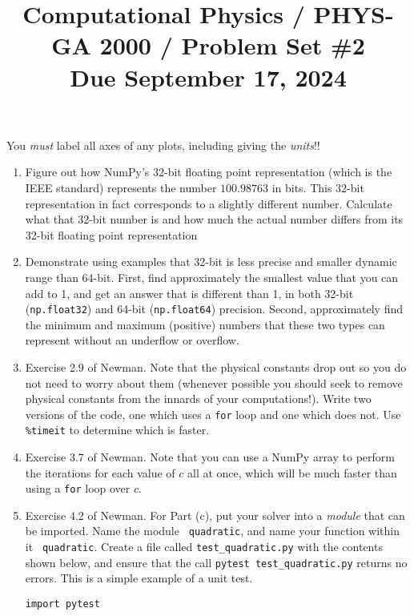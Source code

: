 \documentclass[11pt, preprint]{aastex}
\begin{document}
\title{\bf Computational Physics / PHYS-GA 2000 / Problem Set \#2
\\ Due September 17, 2024 }

You {\it must} label all axes of any plots, including giving the {\it
  units}!!

\begin{enumerate}

  \item Figure out how NumPy's 32-bit floating point representation
    (which is the IEEE standard) represents the number $100.98763$ in
    bits. This 32-bit representation in fact corresponds to a slightly
    different number. Calculate what that 32-bit number is and how
    much the actual number differs from its 32-bit floating point
    representation

  \item Demonstrate using examples that 32-bit is less precise and
    smaller dynamic range than 64-bit. First, find approximately the
    smallest value that you can add to 1, and get an answer that is
    different than 1, in both 32-bit ({\tt np.float32}) and 64-bit
    ({\tt np.float64}) precision. Second, approximately find the
    minimum and maximum (positive) numbers that these two types can
    represent without an underflow or overflow.

  \item Exercise 2.9 of Newman. Note that the physical constants drop
    out so you do not need to worry about them (whenever possible you
    should seek to remove physical constants from the innards of your
    computations!).  Write two versions of the code, one which uses a
    {\tt for} loop and one which does not.  Use {\tt \%timeit} to
    determine which is faster.

  \item Exercise 3.7 of Newman.  Note that you can use a NumPy array
    to perform the iterations for each value of $c$ all at once, which
    will be much faster than using a {\tt for} loop over $c$.

  \item Exercise 4.2 of Newman. For Part (c), put your solver into a
    {\it module} that can be imported. Name the module {\tt
      quadratic}, and name your function within it {\tt
      quadratic}. Create a file called {\tt test\_quadratic.py} with
    the contents shown below, and ensure that the call {\tt pytest
      test\_quadratic.py} returns no errors. This is a simple example
    of a unit test.
\begin{verbatim}
import pytest


\end{verbatim}
\end{enumerate}
\end{document}
